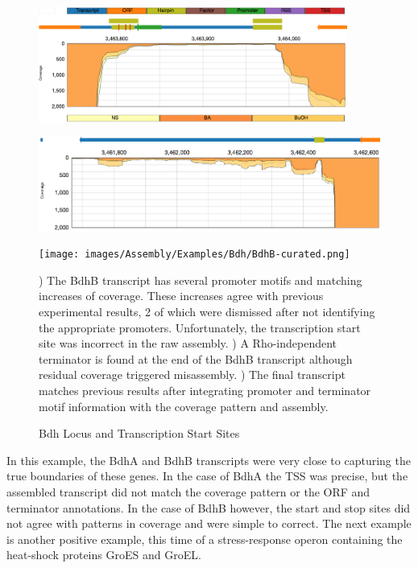 \begin{figure}
\small
{\includegraphics[width=\textwidth,height=1.5in]{images/Assembly/Examples/Bdh/BdhB-TSS.png}
\label{fig:6a}}
{\includegraphics[width=\textwidth,height=1.5in]{images/Assembly/Examples/Bdh/BdhB-termination.png}
\label{fig:6b}}
{\texttt{[image: images/Assembly/Examples/Bdh/BdhB-curated.png]}
\label{fig:6c}}
\caption{Bdh Locus and Transcription Start Sites}
) The BdhB transcript has several promoter motifs and matching increases of coverage. These increases agree with previous experimental results\cite{72}, 2 of which were dismissed after not identifying the appropriate promoters. Unfortunately, the transcription start site was incorrect in the raw assembly. ) A Rho-independent terminator is found at the end of the BdhB transcript although residual coverage triggered misassembly. ) The final transcript matches previous results after integrating promoter and terminator motif information with the coverage pattern and assembly.
\end{figure}

In this example, the BdhA and BdhB transcripts were very close to capturing the true boundaries of these genes. In the case of BdhA the TSS was precise, but the assembled transcript did not match the coverage pattern or the ORF and terminator annotations. In the case of BdhB however, the start and stop sites did not agree with patterns in coverage and were simple to correct. The next example is another positive example, this time of a stress-response operon containing the heat-shock proteins GroES and GroEL.

